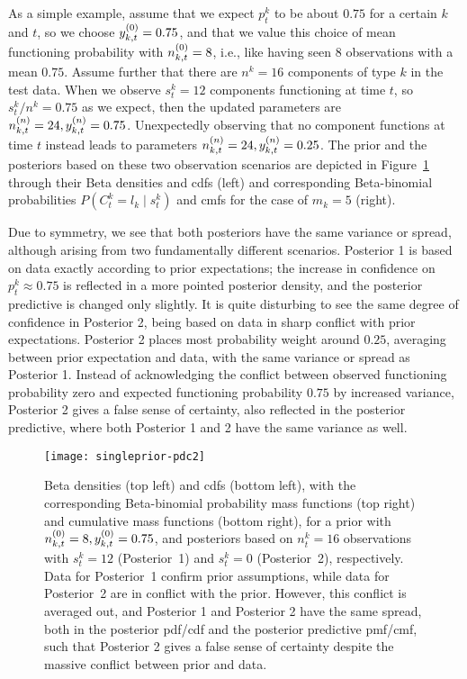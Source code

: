 \documentclass[authoryear, 12pt, a4paper]{elsarticle}
\newcommand{\ptk}{p^k_t}
\begin{document}
As a simple example, assume that we expect $\ptk$ to be about $0.75$ for a certain $k$ and $t$,
so we choose $y^{(0)}_{k,t} = 0.75$,
and that we value this choice of mean functioning probability with $n^{(0)}_{k,t} = 8$,
i.e., like having seen $8$ observations with a mean $0.75$.
Assume further that there are $n^k = 16$ components of type $k$ in the test data.
When we observe $s^k_t = 12$ components functioning at time $t$,
so $s^k_t/n^k = 0.75$ as we expect,
then the updated parameters are $n^{(n)}_{k,t} = 24, y^{(n)}_{k,t}=0.75$.
Unexpectedly observing that no component functions at time $t$ instead
leads to parameters $n^{(n)}_{k,t} = 24, y^{(n)}_{k,t}=0.25$.
The prior and the posteriors based on these two observation scenarios
are depicted in Figure~\ref{fig:singleprior-pdc}
through their Beta densities and cdfs (left)
and corresponding Beta-binomial probabilities $P(C^k_t = l_k\mid s^k_t)$ and cmfs
for the case of $m_k = 5$ (right).

Due to symmetry, we see that both posteriors have the same variance or spread,
although arising from two fundamentally different scenarios.
Posterior 1 is based on data exactly according to prior expectations;
the increase in confidence on $\ptk \approx 0.75$
is reflected in a more pointed posterior density,
and the posterior predictive is changed only slightly.
It is quite disturbing to see the same degree of confidence in Posterior 2,
being based on data in sharp conflict with prior expectations.
Posterior 2 places most probability weight around $0.25$,
averaging between prior expectation and data,
with the same variance or spread as Posterior 1.
Instead of acknowledging the conflict between observed functioning probability zero
and expected functioning probability $0.75$ by increased variance,
Posterior 2 gives a false sense of certainty,
also reflected in the posterior predictive,
where both Posterior 1 and 2 have the same variance as well.

\begin{figure}
\texttt{[image: singleprior-pdc2]}
\caption{Beta densities (top left) and cdfs (bottom left),
with the corresponding Beta-binomial probability mass functions (top right) and cumulative mass functions (bottom right),
for a prior with $n^{(0)}_{k,t} = 8, y^{(0)}_{k,t} = 0.75$,
and posteriors based on $n^k_t=16$ observations with $s^k_t=12$ (Posterior~1) and $s^k_t=0$ (Posterior~2), respectively.
Data for Posterior~1 confirm prior assumptions,
while data for Posterior~2 are in conflict with the prior.
However, this conflict is averaged out,
and Posterior 1 and Posterior 2 have the same spread, both in the posterior pdf/cdf and the posterior predictive pmf/cmf,
such that Posterior 2 gives a false sense of certainty despite the massive conflict between prior and data.}
\label{fig:singleprior-pdc}
\end{figure}
\end{document}
